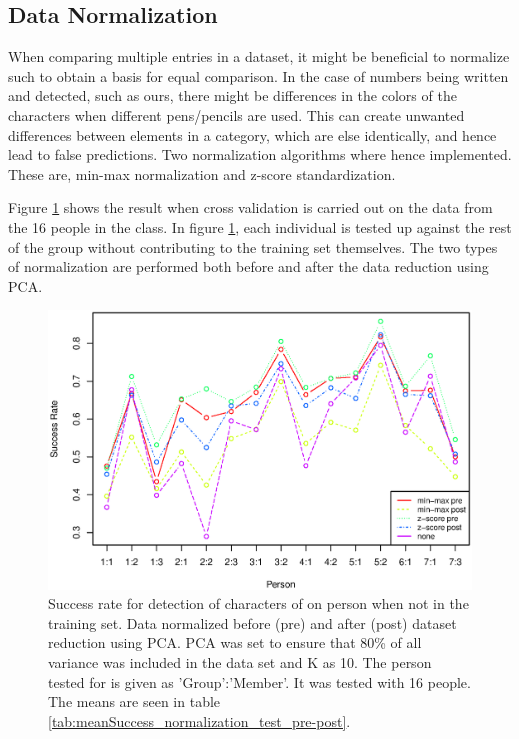 \subsection{Data Normalization}
\label{sec:DataNormalization}
When comparing multiple entries in a dataset, it might be beneficial to normalize such to obtain a basis for equal comparison.
In the case of numbers being written and detected, such as ours, there might be differences in the colors of the characters when different pens/pencils are used.
This can create unwanted differences between elements in a category, which are else identically, and hence lead to false predictions.
Two normalization algorithms where hence implemented.
These are, min-max normalization and z-score standardization.

Figure \ref{fig:normalization_test_pre-post} shows the result when cross validation is carried out on the data from the 16 people in the class.
In figure \ref{fig:normalization_test_pre-post}, each individual is tested up against the rest of the group without contributing to the training set themselves. 
The two types of normalization are performed both before and after the data reduction using PCA.


\begin{figure}[H]
\centering
\includegraphics[width = \textwidth]{graphics/graph_normalization}
\caption[Comparison of different students.]{Success rate for detection of characters of on person when not in the training set. 
Data normalized before (pre) and after (post) dataset reduction using PCA.
PCA was set to ensure that 80\% of all variance was included in the data set and K as 10.
The person tested for is given as 'Group':'Member'.
It was tested with 16 people.
The means are seen in table \ref{tab:meanSuccess_normalization_test_pre-post}.
}
\label{fig:normalization_test_pre-post}
\end{figure}

